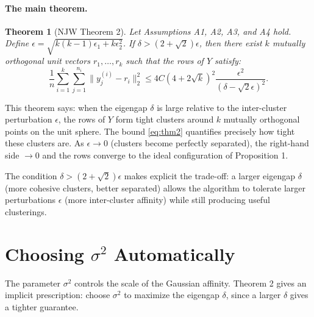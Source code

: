 \documentclass[11pt]{article}
\theoremstyle{plain}
\newtheorem{theorem}{Theorem}[section]
\theoremstyle{definition}
\begin{document}
\paragraph{The main theorem.}

\begin{theorem}[NJW Theorem 2]
Let Assumptions A1, A2, A3, and A4 hold. Define $\epsilon = \sqrt{k(k-1)\epsilon_1 + k\epsilon_2^2}$. If $\delta > (2 + \sqrt{2})\epsilon$, then there exist $k$ mutually orthogonal unit vectors $r_1, \ldots, r_k$ such that the rows of $Y$ satisfy:
\begin{equation}
    \frac{1}{n} \sum_{i=1}^{k} \sum_{j=1}^{n_i} \|y_j^{(i)} - r_i\|_2^2
    \leq 4C\left(4 + 2\sqrt{k}\right)^2 \frac{\epsilon^2}{(\delta - \sqrt{2}\epsilon)^2}.
    \label{eq:thm2}
\end{equation}
\end{theorem}

This theorem says: when the eigengap $\delta$ is large relative to the inter-cluster perturbation $\epsilon$, the rows of $Y$ form tight clusters around $k$ mutually orthogonal points on the unit sphere. The bound \eqref{eq:thm2} quantifies precisely how tight these clusters are. As $\epsilon \to 0$ (clusters become perfectly separated), the right-hand side $\to 0$ and the rows converge to the ideal configuration of Proposition 1.

The condition $\delta > (2 + \sqrt{2})\epsilon$ makes explicit the trade-off: a larger eigengap $\delta$ (more cohesive clusters, better separated) allows the algorithm to tolerate larger perturbations $\epsilon$ (more inter-cluster affinity) while still producing useful clusterings.

\section{Choosing $\sigma^2$ Automatically}
\label{sec:sigma}

The parameter $\sigma^2$ controls the scale of the Gaussian affinity. Theorem 2 gives an implicit prescription: choose $\sigma^2$ to maximize the eigengap $\delta$, since a larger $\delta$ gives a tighter guarantee.
\end{document}
